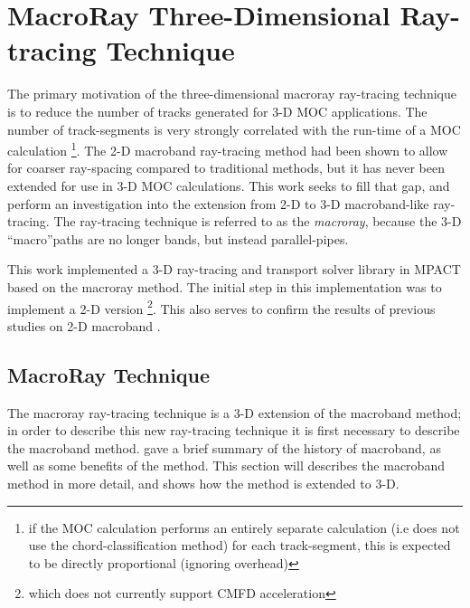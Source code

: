\chapter{MacroRay Three-Dimensional Ray-tracing Technique}{\label{ch:MacroRay}
  
  
  
  \def\figpath{chapters/MacroRay/figures/}
  \graphicspath{ {\figpath} }

  The primary motivation of the three-dimensional macroray ray-tracing technique is to reduce the number of tracks generated for 3-D \ac{MOC} applications.
  The number of track-segments is very strongly correlated with the run-time of a \ac{MOC} calculation \footnote{if the \ac{MOC} calculation performs an entirely separate calculation (i.e does not use the chord-classification method) for each track-segment, this is expected to be directly proportional (ignoring overhead)}.
  The 2-D macroband ray-tracing method had been shown to allow for coarser ray-spacing compared to traditional methods, but it has never been extended for use in 3-D \ac{MOC} calculations.
  This work seeks to fill that gap, and perform an investigation into the extension from 2-D to 3-D macroband-like ray-tracing.
  The ray-tracing technique is referred to as the \emph{macroray}, because the 3-D ``macro''paths are no longer bands, but instead parallel-pipes.

  This work implemented a 3-D ray-tracing and transport solver library in MPACT based on the macroray method.
  The initial step in this implementation was to implement a 2-D version \footnote{which does not currently support \ac{CMFD} acceleration}.
  This also serves to confirm the results of previous studies on 2-D macroband \cite{Yamamoto2005,Fevotte2007}.

  \section{MacroRay Technique}{\label{sec:MR:MacroRay Technique}
    The macroray ray-tracing technique is a 3-D extension of the macroband method; in order to describe this new ray-tracing technique it is first necessary to describe the macroband method.
     gave a brief summary of the history of macroband, as well as some benefits of the method.
    This section will describes the macroband method in more detail, and shows how the method is extended to 3-D.

}}

